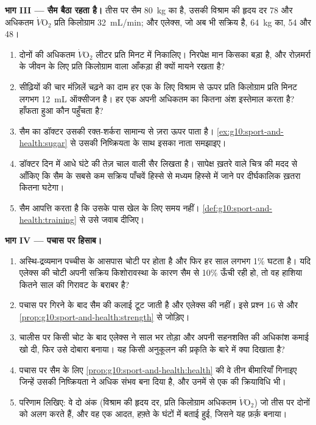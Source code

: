\begin{problem}
\medskip
\noindent\textbf{भाग III --- सैम बैठा रहता है।}
तीस पर सैम \qty{80}{kg} का है, उसकी विश्राम की हृदय दर 78 और अधिकतम
$\dot V\!\mathrm{O_2}$ प्रति किलोग्राम \qty{32}{mL/min}; और एलेक्स, जो
अब भी सक्रिय है, \qty{64}{kg} का, 54 और \num{48}।
\begin{enumerate}[resume]
  \item दोनों की अधिकतम $\dot V\!\mathrm{O_2}$ लीटर प्रति मिनट में
        निकालिए। निरपेक्ष मान किसका बड़ा है, और रोज़मर्रा के जीवन के लिए
        प्रति किलोग्राम वाला आँकड़ा ही क्यों मायने रखता है?
  \item सीढ़ियों की चार मंज़िलें चढ़ने का दाम हर एक के लिए विश्राम से ऊपर
        प्रति किलोग्राम प्रति मिनट लगभग \qty{12}{mL} ऑक्सीजन है। हर एक
        अपनी अधिकतम का कितना अंश इस्तेमाल करता है? हाँफता हुआ कौन
        पहुँचता है?
  \item सैम का डॉक्टर उसकी रक्त-शर्करा सामान्य से ज़रा ऊपर पाता है।
        \cref{ex:g10:sport-and-health:sugar} से उसकी निष्क्रियता के साथ
        इसका नाता समझाइए।
  \item डॉक्टर दिन में आधे घंटे की तेज़ चाल वाली सैर लिखता है। सापेक्ष
        ख़तरे वाले चित्र की मदद से आँकिए कि सैम के सबसे कम सक्रिय
        पाँचवें हिस्से से मध्यम हिस्से में जाने पर दीर्घकालिक ख़तरा कितना
        घटेगा।
  \item सैम आपत्ति करता है कि उसके पास खेल के लिए समय नहीं।
        \cref{def:g10:sport-and-health:training} से उसे जवाब दीजिए।
\end{enumerate}

\medskip
\noindent\textbf{भाग IV --- पचास पर हिसाब।}
\begin{enumerate}[resume]
  \item अस्थि-द्रव्यमान पच्चीस के आसपास चोटी पर होता है और फिर हर साल
        लगभग 1\% घटता है। यदि एलेक्स की चोटी अपनी सक्रिय किशोरावस्था के
        कारण सैम से 10\% ऊँची रही हो, तो वह हाशिया कितने साल की गिरावट
        के बराबर है?
  \item पचास पर गिरने के बाद सैम की कलाई टूट जाती है और एलेक्स की नहीं।
        इसे प्रश्न 16 से और \cref{prop:g10:sport-and-health:strength} से
        जोड़िए।
  \item चालीस पर किसी चोट के बाद एलेक्स ने साल भर  तोड़ा और
        अपनी सहनशक्ति की अधिकांश कमाई खो दी, फिर उसे दोबारा बनाया। यह
        किसी अनुकूलन की प्रकृति के बारे में क्या दिखाता है?
  \item पचास पर सैम के लिए \cref{prop:g10:sport-and-health:health} की
        वे तीन बीमारियाँ गिनाइए जिन्हें उसकी निष्क्रियता ने अधिक संभव बना
        दिया है, और उनमें से एक की क्रियाविधि भी।
  \item परिणाम लिखिए: वे दो अंक (विश्राम की हृदय दर, प्रति किलोग्राम
        अधिकतम $\dot V\!\mathrm{O_2}$) जो तीस पर दोनों को अलग करते हैं,
        और वह एक आदत, हफ़्ते के घंटों में बताई हुई, जिसने यह फ़र्क़ बनाया।
\end{enumerate}
\end{problem}
